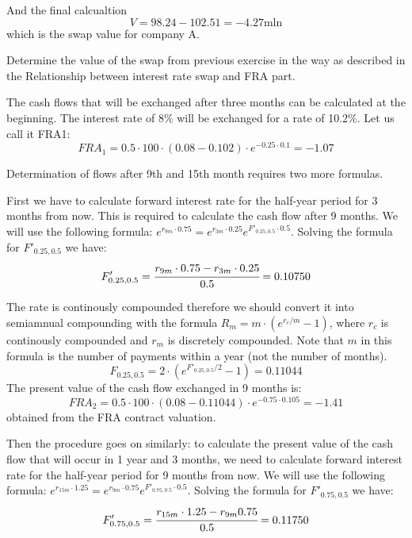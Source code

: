 \documentclass[12pt,a4paper]{exam}
\begin{document}
\begin{questions}
\begin{solution}
And the final calcualtion
\begin{equation*}
V = 98.24-102.51=-4.27\text{mln}
\end{equation*}
which is the swap value for company A.
\end{solution}

\question Determine the value of the swap from previous exercise in the way as described in the Relationship between interest rate swap and FRA part.
\begin{solution}
The cash flows that will be exchanged after three months can be calculated at the beginning. The interest rate of 8\% will be exchanged for a rate of 10.2\%. Let us call it FRA1:
\begin{equation*}
FRA_1 = 0.5\cdot 100\cdot (0.08-0.102)\cdot e^{-0.25\cdot 0.1}=-1.07
\end{equation*}

Determination of flows after 9th and 15th month requires two more formulas.

First we have to calculate forward interest rate for the half-year period for 3 months from now. This is required to calculate the cash flow after 9 months. We will use the following formula: $e^{r_{9m}\cdot0.75}=e^{r_{3m}\cdot0.25}e^{F'_{0.25, 0.5}\cdot 0.5}$. Solving the formula for $F'_{0.25, 0.5}$ we have:
\begin{equation*}
F'_{0.25, 0.5}=\cfrac{r_{9m}\cdot 0.75-r_{3m}\cdot0.25}{0.5}=0.10750
\end{equation*}

The rate is continously compounded therefore we should convert it into semiamnual compounding with the formula $R_m = m\cdot(e^{r_c/m}-1)$, where $r_c$ is continously compounded and $r_m$ is discretely compounded. Note that $m$ in this formula is the number of payments within a year (not the number of months).
\begin{equation*}
F_{0.25, 0.5}=2\cdot(e^{F'_{0.25,0.5}/2}-1)=0.11044
\end{equation*}
The present value of the cash flow exchanged in 9 months is:
\begin{equation*}
FRA_2=0.5\cdot100\cdot(0.08-0.11044)\cdot e^{-0.75\cdot0.105}=-1.41
\end{equation*}
obtained from the FRA contract valuation.

Then the procedure goes on similarly: to calculate the present value of the cash flow that will occur in 1 year and 3 months, we need to calculate forward interest rate for the half-year period for 9 months from now. We will use the following formula: $e^{r_{15m}\cdot 1.25}=e^{r_{9m}\cdot 0.75}e^{F'_{0.75, 0.5}\cdot 0.5}$. Solving the formula for $F'_{0.75, 0.5}$
 we have:
\begin{equation*}
F'_{0.75, 0.5}=\cfrac{r_{15m}\cdot1.25-r_{9m}0.75}{0.5}=0.11750
\end{equation*}


\end{solution}
\end{questions}
\end{document}
